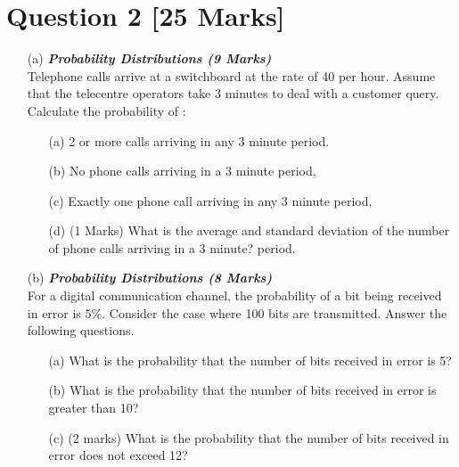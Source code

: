 
\section*{Question 2 [25 Marks]} 
\begin{itemize}
\item[(a)] \textbf{\textit{Probability Distributions (9 Marks)}}\\
Telephone calls arrive at a switchboard at the rate of 40 per hour.  Assume that the telecentre operators take 3 minutes to deal with a customer query.  Calculate the probability of :
\begin{itemize} 
\item[(a)]                  2 or more calls arriving in any 3 minute period.
\item[(b)]                No phone calls arriving in a 3 minute period,
\item[(c)]               Exactly one phone call arriving in any 3 minute period,
\item[(d)] (1 Marks)             What is the average and standard deviation of the number of phone calls arriving in a 3 minute? period.
\end{itemize}


\bigskip

\item[(b)] \textbf{\textit{Probability Distributions (8 Marks)}}\\
For a digital communication channel, the probability of a bit being received in error is $5\%$. Consider the case where 100 bits are transmitted. Answer the following questions.

\begin{itemize}
\item[(a)] 	What is the probability that the number of bits received in error is 5?
\item[(b)]  What is the probability that the number of bits received in error is greater than 10?
\item[(c)] (2 marks)	What is the probability that the number of bits received in error does not exceed 12?
\end{itemize}


\end{itemize}
